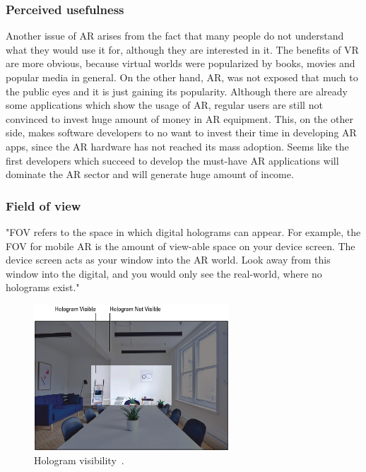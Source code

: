 \documentclass[12pt]{article}
\begin{document}
\subsubsection{Perceived usefulness}\label{sec:Perceived usefulness}
Another issue of \ac{AR} arises from the fact that many people do not understand what they would use it for, although they are interested in it. The benefits of \ac{VR} are more obvious, because virtual worlds were popularized by books, movies and popular media in general. On the other hand, \ac{AR}, was not exposed that much to the public eyes and it is just gaining its popularity. Although there are already some applications which show the usage of \ac{AR}, regular users are still not convinced to invest huge amount of money in \ac{AR} equipment. This, on the other side, makes software developers to no want to invest their time in developing \ac{AR} apps, since the \ac{AR} hardware has not reached its mass adoption. Seems like the first developers which succeed to develop the must-have \ac{AR} applications will dominate the AR sector and will generate huge amount of income.

\subsubsection{Field of view} \label{sec:Field of view}
"\ac{FOV} refers to the space in which digital holograms can appear. For example, the \ac{FOV} for mobile \ac{AR} is the amount of view-able space on your device screen. The device screen acts as your window into the \ac{AR} world. Look away from this window into the digital, and you would only see the real-world, where no holograms exist."~\cite{dummies}
 
\begin{figure} [ht]
    \centering
    \includegraphics[width=0.65\textwidth]{../images/hologram-visibility.png}
    \caption{Hologram visibility~\cite{dummies}.}
    \label{fig:hologram_visibility}
\end{figure}
\end{document}
